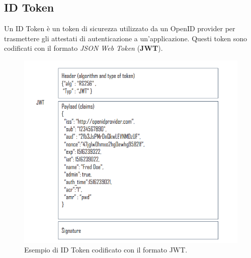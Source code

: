 \subsection{ID Token}

Un ID Token è un token di sicurezza utilizzato da un OpenID provider per trasmettere
gli attestati di autenticazione a un'applicazione. Questi token sono codificati
con il formato \textit{JSON Web Token} (\textbf{JWT}).

\begin{figure}[H]
      \centering
      \includegraphics[width=\textwidth, keepaspectratio]{capitoli/id_managing/imgs/jwt.png}
      \caption{Esempio di ID Token codificato con il formato JWT.}
\end{figure}

